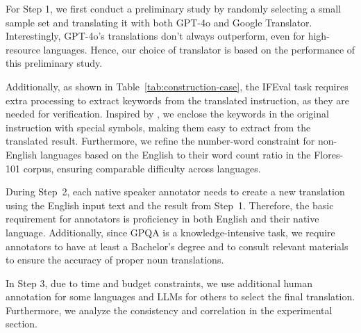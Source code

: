 For Step 1, we first conduct a preliminary study by randomly selecting a small sample set and translating it with both GPT-4o and Google Translator. 
Interestingly, GPT-4o's translations don't always outperform, even for high-resource languages. 
Hence, our choice of translator is based on the performance of this preliminary study.

Additionally, as shown in Table~\ref{tab:construction-case}, the IFEval task requires extra processing to extract keywords from the translated instruction, as they are needed for verification. Inspired by \citet{yuan-etal-2020-enhancing}, we enclose the keywords in the original instruction with special symbols, making them easy to extract from the translated result. Furthermore, we refine the number-word constraint for non-English languages based on the English to their word count ratio in the Flores-101 corpus, ensuring comparable difficulty across languages.


During Step~2, each native speaker annotator needs to create a new translation using the English input text and the result from Step~1. Therefore, the basic requirement for annotators is proficiency in both English and their native language. Additionally, since GPQA is a knowledge-intensive task, we require annotators to have at least a Bachelor's degree and to consult relevant materials to ensure the accuracy of proper noun translations.

In Step 3, due to time and budget constraints, we use additional human annotation for some languages and LLMs for others to select the final translation. Furthermore, we analyze the consistency and correlation in the experimental section.


